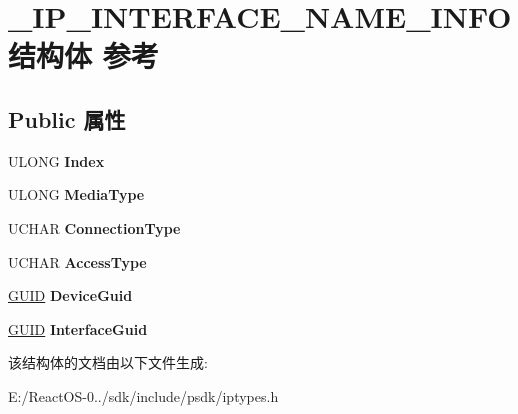 \hypertarget{struct___i_p___i_n_t_e_r_f_a_c_e___n_a_m_e___i_n_f_o}{}\section{\+\_\+\+I\+P\+\_\+\+I\+N\+T\+E\+R\+F\+A\+C\+E\+\_\+\+N\+A\+M\+E\+\_\+\+I\+N\+F\+O结构体 参考}
\label{struct___i_p___i_n_t_e_r_f_a_c_e___n_a_m_e___i_n_f_o}
\subsection*{Public 属性}
\begin{DoxyCompactItemize}
\item 
\mbox{\label{struct___i_p___i_n_t_e_r_f_a_c_e___n_a_m_e___i_n_f_o_a0af96f273e6555956df280ef159a7003}} 
U\+L\+O\+NG {\bfseries Index}
\item 
\mbox{\label{struct___i_p___i_n_t_e_r_f_a_c_e___n_a_m_e___i_n_f_o_adc9a8c1b61223d76c39e38f5228724ca}} 
U\+L\+O\+NG {\bfseries Media\+Type}
\item 
\mbox{\label{struct___i_p___i_n_t_e_r_f_a_c_e___n_a_m_e___i_n_f_o_ac00ab86c15283ddfd94841c36ef54096}} 
U\+C\+H\+AR {\bfseries Connection\+Type}
\item 
\mbox{\label{struct___i_p___i_n_t_e_r_f_a_c_e___n_a_m_e___i_n_f_o_ac8ccfac82a4f67a36afeee48e7ffe9fa}} 
U\+C\+H\+AR {\bfseries Access\+Type}
\item 
\mbox{\label{struct___i_p___i_n_t_e_r_f_a_c_e___n_a_m_e___i_n_f_o_a3cf3df8d7f45b7ea84e4333bb17aef97}} 
\hyperlink{interface_g_u_i_d}{G\+U\+ID} {\bfseries Device\+Guid}
\item 
\mbox{\label{struct___i_p___i_n_t_e_r_f_a_c_e___n_a_m_e___i_n_f_o_a56de443a9adf71fb33151629efb303e1}} 
\hyperlink{interface_g_u_i_d}{G\+U\+ID} {\bfseries Interface\+Guid}
\end{DoxyCompactItemize}


该结构体的文档由以下文件生成\+:\begin{DoxyCompactItemize}
\item 
E\+:/\+React\+O\+S-\/0../sdk/include/psdk/iptypes.\+h\end{DoxyCompactItemize}
